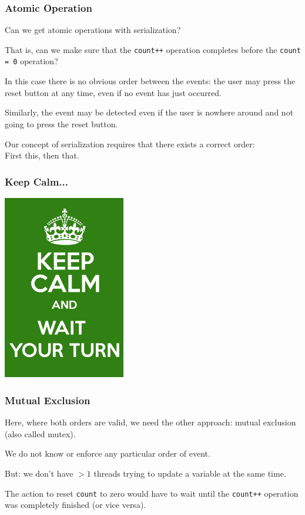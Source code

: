 \begin{frame}
\frametitle{Atomic Operation}

Can we get atomic operations with serialization?

That is, can we make sure that the \texttt{count++} operation completes before the \texttt{count = 0} operation? 

In this case there is no obvious order between the events: the user may press the reset button at any time, even if no event has just occurred. 

Similarly, the event may be detected even if the user is nowhere around and not going to press the reset button. 

Our concept of serialization requires that there exists a correct order:\\
\quad First this, then that. 


\end{frame}


\begin{frame}
\frametitle{Keep Calm...}

\begin{center}
	\includegraphics[width=0.4\textwidth]{images/waityourturn.png}
\end{center}

\end{frame}


\begin{frame}
\frametitle{Mutual Exclusion}

Here, where both orders are valid, we need the other approach: mutual exclusion (also called \alert{mutex}).

We do not know or enforce any particular order of event.

But: we don't have $>1$ threads trying to update a variable at the same time. 

The action to reset \texttt{count} to zero would have to wait until the \texttt{count++} operation was completely finished (or vice versa). 


\end{frame}


